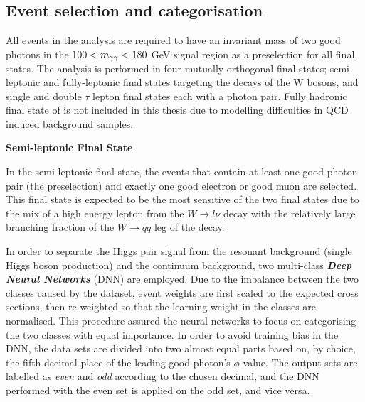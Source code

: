 {\subsection{Event selection and categorisation}

All events in the analysis are required to have an invariant mass of two good photons in the $100<m_{\gamma\gamma}<180$ GeV signal region as a preselection for all final states. The analysis is performed in four mutually orthogonal final states; semi-leptonic and fully-leptonic final states targeting the decays of the W bosons, and single and double $\tau$ lepton final states each with a photon pair. Fully hadronic final state of \wwgg is not included in this thesis due to modelling difficulties in QCD induced background samples.

\textbf{Semi-leptonic Final State}

In the semi-leptonic final state, the events that contain at least one good photon pair (the preselection) and exactly one good electron or good muon are selected. This final state is expected to be the most sensitive of the two \wwgg final states due to the mix of a high energy lepton from the $W{\rightarrow}l\nu$ decay with the relatively large branching fraction of the $W{\rightarrow}qq$ leg of the decay.

In order to separate the Higgs pair signal from the resonant background (single Higgs boson production) and the continuum background, two multi-class \emph{\textbf{Deep Neural Networks}} (DNN) are employed. Due to the imbalance between the two classes caused by the dataset, event weights are first scaled to the expected cross sections, then re-weighted so that the learning weight in the classes are normalised. This procedure assured the neural networks to focus on categorising the two classes with equal importance. In order to avoid training bias in the DNN, the data sets are divided into two almost equal parts based on, by choice, the fifth decimal place of the leading good photon's $\phi$ value. The output sets are labelled as \emph{even} and \emph{odd} according to the chosen decimal, and the DNN performed with the even set is applied on the odd set, and vice versa.

}
